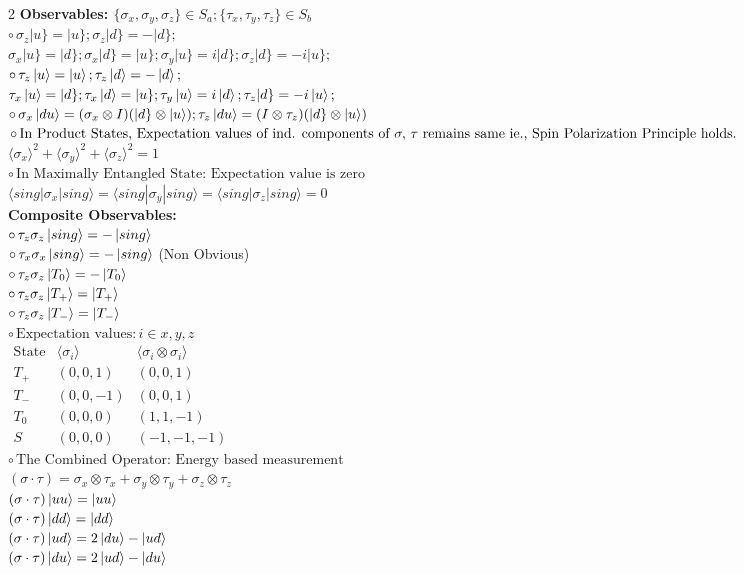 \documentclass[10pt,a4paper]{article}
\begin{document}
\begin{multicols}{2}
\textbf{Observables: $\{\sigma_x, \sigma_y, \sigma_z\} \in S_a; \{\tau_x, \tau_y, \tau_z\} \in S_b $}\\
$\circ\,\sigma_z|u\}=|u\}; \sigma_z|d\}=-|d\};$\\ 
$\sigma_x|u\} = |d\}; \sigma_x|d\} = |u\}; \sigma_y|u\} = i|d\}; \sigma_z|d\} = -i|u\}; $\\
$\circ\,\tau_z\ket{u}=\ket{u}; \tau_z\ket{d}=-\ket{d};$\\ 
$\tau_x\ket{u} = |d\}; \tau_x\ket{d} = |u\}; \tau_y\ket{u} = i\ket{d}; \tau_z|d\} = -i\ket{u}; $\\
$\circ\,\sigma_x\ket{du} = (\sigma_x \otimes I)(|d\} \otimes \ket{u}); \tau_z\ket{du} = (I \otimes \tau_z)(|d\} \otimes \ket{u}) $\\
$\circ\,\text{In Product States, Expectation values of ind. components of } \\\sigma,\, \tau \text{ remains same  ie., Spin Polarization Principle holds.} $  \\
$\langle \sigma_x \rangle^2 + \langle \sigma_y \rangle^2 + \langle \sigma_z \rangle^2 = 1$\\
$\circ\, \text{In Maximally Entangled State: Expectation value is zero}$ \\
$\langle sing|\sigma_x|sing \rangle = \langle sing|\sigma_y |sing \rangle = \langle sing|\sigma_z |sing \rangle = 0$\\
\textbf{Composite Observables: }\\
$\circ\,\tau_z\sigma_z\ket{sing} = -\ket{sing}$\\
$\circ\,\tau_x\sigma_x\ket{sing} = -\ket{sing}$ (Non Obvious)\\
$\circ\,\tau_z\sigma_z\ket{T_0} = -\ket{T_0}$\\
$\circ\,\tau_z\sigma_z\ket{T_+} = \ket{T_+}$\\
$\circ\,\tau_z\sigma_z\ket{T_-} = \ket{T_-}$\\
$\circ\,\text{Expectation values}: i \in {x,y,z}$\\
{\small
$\begin{array}{c|c|c}
\text{State} & \langle \sigma_i \rangle & \langle \sigma_i\otimes\sigma_i \rangle \\
\hline
T_+ & (0,0,1) & (0,0,1) \\
T_- & (0,0,-1) & (0,0,1) \\
T_0 & (0,0,0) & (1,1,-1) \\
S   & (0,0,0) & (-1,-1,-1)
\end{array}$
}\\
$\circ\,\text{The Combined Operator: Energy based measurement}$ \\
$(\sigma\cdot\tau)=\sigma_x\otimes\tau_x + \sigma_y\otimes\tau_y + \sigma_z\otimes\tau_z$ \\
$(\sigma\cdot\tau)\ket{uu}=\ket{uu}$ \\
$(\sigma\cdot\tau)\ket{dd}=\ket{dd}$ \\
$(\sigma\cdot\tau)\ket{ud}=2\ket{du}-\ket{ud}$ \\
$(\sigma\cdot\tau)\ket{du}=2\ket{ud}-\ket{du}$ \\


\end{multicols}
\end{document}
